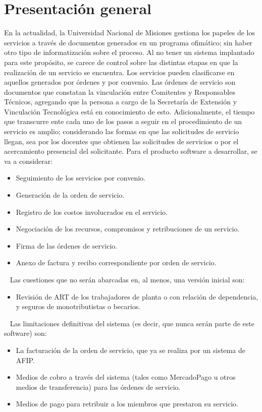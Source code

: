 \section{Presentaci\'on general}
\normalsize{ \indent
En la actualidad, la Universidad Nacional de Misiones
gestiona los papeles de los servicios a trav\'es
de documentos generados en un programa ofim\'atico;
sin haber otro tipo de informatizaci\'on sobre
el proceso. Al no tener un sistema implantado para
este prop\'osito, se carece de control sobre las
distintas etapas en que la realizaci\'on de un
servicio se encuentra.
}
\newline
\normalsize{ \indent
Los servicios pueden clasificarse en aquellos
generados por \'ordenes y por convenio.
Las \'ordenes de servicio son documentos que
constatan la vinculaci\'on entre Comitentes y
Responsables T\'ecnicos, agregando que la persona
a cargo de la Secretar\'ia de Extensi\'on y
Vinculaci\'on Tecnol\'ogica est\'a en conocimiento
de esto.
}
\newline
\normalsize{ \indent
Adicionalmente, el tiempo que transcurre ente cada
uno de los pasos a seguir en el procedimiento de un
servicio es amplio; considerando las formas en que
las solicitudes de servicio llegan, sea por los
docentes que obtienen las solicitudes de servicios
o por el acercamiento presencial del solicitante.
}
\newline
\normalsize{ \indent
Para el producto software a desarrollar, se va
a considerar:
}
\begin{itemize}
	\item Seguimiento de los servicios por
	convenio.
	\item Generaci\'on de la orden de servicio.
	\item Registro de los costos involucrados en
	el servicio.
	\item Negociaci\'on de los recursos,
	compromisos y retribuciones de un servicio.
	\item Firma de las \'ordenes de servicio.
	\item Anexo de factura y recibo
	correspondiente por orden de servicio.
\end{itemize}
\ \newline
\normalsize{ \indent
Las cuestiones que no ser\'an abarcadas en, al
menos, una versi\'on inicial son:
}
\begin{itemize}
	\item Revisi\'on de ART de los trabajadores
	de planta o con relaci\'on de dependencia,
	y seguros de monotributistas o becarios.
\end{itemize}
\ \newline
\normalsize{ \indent
Las limitaciones definitivas del sistema (es
decir, que nunca ser\'an parte de este software)
son:
}
\begin{itemize}
	\item La facturaci\'on de la orden de
	servicio, que ya se realiza por un sistema
	de AFIP.
	\item Medios de cobro a trav\'es del sistema
	(tales como MercadoPago u otros medios de
	transferencia) para las \'ordenes de servicio.
	\item Medios de pago para retribuir a los
	miembros que prestaron su servicio.
\end{itemize}
